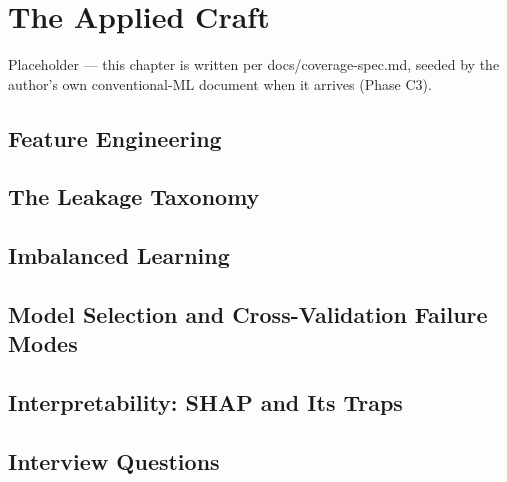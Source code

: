 \chapter{The Applied Craft}
\label{cml:chap:applied_craft}

\begin{tldr}
Placeholder — this chapter is written per docs/coverage-spec.md, seeded by the author's own conventional-ML document when it arrives (Phase C3).
\end{tldr}

\section{Feature Engineering}

\section{The Leakage Taxonomy}

\section{Imbalanced Learning}

\section{Model Selection and Cross-Validation Failure Modes}

\section{Interpretability: SHAP and Its Traps}

\section{Interview Questions}


